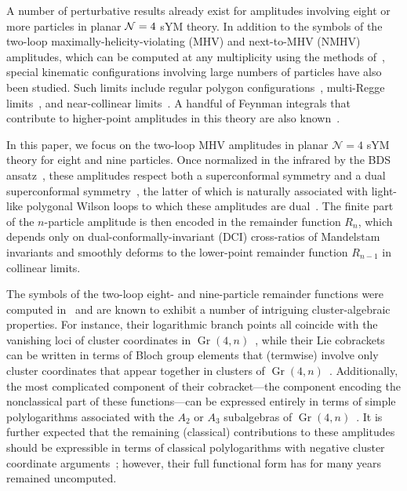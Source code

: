 \documentclass[11pt]{article}
\DeclareMathOperator{\Gr}{Gr}
\begin{document}
A number of perturbative results already exist for amplitudes involving eight or more particles in planar ${\cal N}=4$ sYM theory. In addition to the symbols of the two-loop maximally-helicity-violating (MHV) and next-to-MHV (NMHV) amplitudes, which can be computed at any multiplicity using the methods of~\cite{CaronHuot:2011ky,Zhang:2019vnm,He:2020vob}, special kinematic configurations involving large numbers of particles have also been studied. Such limits include regular polygon configurations~\cite{Brandhuber:2009da,DelDuca:2010zp,Heslop:2010kq,Gaiotto:2010fk}, multi-Regge limits~\cite{Bartels:2008ce,Lipatov:2012gk,Bargheer:2015djt,DelDuca:2016lad,DelDuca:2018raq,DelDuca:2019tur}, and near-collinear limits~\cite{Alday:2010ku,Basso:2013vsa,Basso:2013aha,Basso:2014koa,Basso:2014jfa,Basso:2014nra,Belitsky:2014sla,Belitsky:2014lta,Basso:2014hfa,Belitsky:2015efa,Basso:2015rta,Basso:2015uxa,Belitsky:2016vyq}. A handful of Feynman integrals that contribute to higher-point amplitudes in this theory are also known~\cite{Bourjaily:2018aeq,Henn:2018cdp,He:2020uxy,He:2020lcu,Bourjaily:2021lnz}. 

In this paper, we focus on the two-loop MHV amplitudes in planar $\mathcal{N}=4$ sYM theory for eight and nine particles. Once normalized in the infrared by the BDS ansatz~\cite{Bern:2005iz}, these amplitudes respect both a superconformal symmetry and a dual superconformal symmetry~\cite{Drummond:2007au,Drummond:2006rz,Bern:2006ew,Bern:2007ct,Alday:2007he}, the latter of which is naturally associated with light-like polygonal Wilson loops to which these amplitudes are dual~\cite{Drummond:2007au,Alday:2007hr,Drummond:2007aua,Brandhuber:2007yx,Drummond:2007cf,Bern:2008ap,Drummond:2008aq}. The finite part of the $n$-particle amplitude is then encoded in the remainder function $R_n$, which depends only on dual-conformally-invariant (DCI) cross-ratios of Mandelstam invariants and smoothly deforms to the lower-point remainder function $R_{n{-}1}$ in collinear limits.

The symbols of the two-loop eight- and nine-particle remainder functions were computed in~\cite{CaronHuot:2011ky} and are known to exhibit a number of intriguing cluster-algebraic properties. For instance, their logarithmic branch points all coincide with the vanishing loci of cluster coordinates in $\Gr(4,n)$~\cite{Golden:2013xva}, while their Lie cobrackets can be written in terms of Bloch group elements that (termwise) involve only cluster coordinates that appear together in clusters of $\Gr(4,n)$~\cite{Golden:2014pua}. Additionally, the most complicated component of their cobracket---the component encoding the nonclassical part of these functions---can be expressed entirely in terms of simple polylogarithms associated with the $A_2$ or $A_3$ subalgebras of $\Gr(4,n)$~\cite{Golden:2014xqa}. It is further expected that the remaining (classical) contributions to these amplitudes should be expressible in terms of classical polylogarithms with negative cluster coordinate arguments~\cite{Golden:2014xqf}; however, their full functional form has for many years remained uncomputed. 
\end{document}
